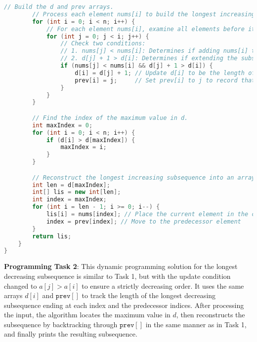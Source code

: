 \documentclass[12pt,letterpaper,final]{report}
\begin{document}
\begin{lstlisting}[language=Java]
        // Build the d and prev arrays.
        // Process each element nums[i] to build the longest increasing subsequence ending at that index
        for (int i = 0; i < n; i++) {
            // For each element nums[i], examine all elements before it
            for (int j = 0; j < i; j++) {
                // Check two conditions:
                // 1. nums[j] < nums[i]: Determines if adding nums[i] to the subsequence ending at j maintains increasing order.
                // 2. d[j] + 1 > d[i]: Determines if extending the subsequence ending at j by nums[i] results in a longer subsequence than the current known subsequence ending at i
                if (nums[j] < nums[i] && d[j] + 1 > d[i]) {
                    d[i] = d[j] + 1; // Update d[i] to be the length of the new longer subsequence ending at i
                    prev[i] = j;     // Set prev[i] to j to record that the best subsequence ending at i comes from extending the subsequence ending at j
                }
            }
        }

        // Find the index of the maximum value in d.
        int maxIndex = 0;
        for (int i = 0; i < n; i++) {
            if (d[i] > d[maxIndex]) {
                maxIndex = i;
            }
        }

        // Reconstruct the longest increasing subsequence into an array: lis []
        int len = d[maxIndex];
        int[] lis = new int[len];
        int index = maxIndex;
        for (int i = len - 1; i >= 0; i--) {
            lis[i] = nums[index]; // Place the current element in the correct position in the lis array
            index = prev[index]; // Move to the predecessor element
        }
        return lis;
    }
}
\end{lstlisting}

\pagebreak
\textbf{Programming Task 2}: This dynamic programming solution for the longest decreasing subsequence is similar to Task 1, but with the update condition changed to \(a[j] > a[i]\) to ensure a strictly decreasing order. It uses the same arrays \(d[i]\) and \(\texttt{prev}[]\) to track the length of the longest decreasing subsequence ending at each index and the predecessor indices. After processing the input, the algorithm locates the maximum value in \(d\), then reconstructs the subsequence by backtracking through \(\texttt{prev}[]\) in the same manner as in Task 1, and finally prints the resulting subsequence.
\end{document}

